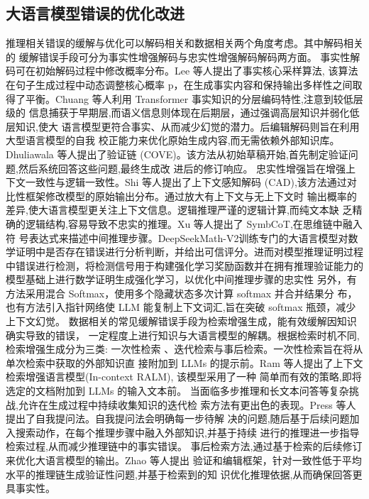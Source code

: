 \subsection{大语言模型错误的优化改进}
推理相关错误的缓解与优化可以解码相关和数据相关两个角度考虑。其中解码相关的
缓解错误手段可分为事实性增强解码与忠实性增强解码解码两方面。
事实性解码可在初始解码过程中修改概率分布。Lee 等人\cite{ref23_lee2022factuality}提出了事实核心采样算法,
该算法在句子生成过程中动态调整核心概率 p，在生成事实内容和保持输出多样性之间取
得了平衡。Chuang 等人\cite{ref18_chuang2023dola}利用 Transformer 事实知识的分层编码特性,注意到较低层级的
信息捕获于早期层,而语义信息则体现在后期层，通过强调高层知识并弱化低层知识,使大
语言模型更符合事实、从而减少幻觉的潜力。后编辑解码则旨在利用大型语言模型的自我
校正能力来优化原始生成内容,而无需依赖外部知识库。Dhuliawala 等人\cite{ref08_dhuliawala2023cove}提出了验证链
(COVE)。该方法从初始草稿开始,首先制定验证问题,然后系统回答这些问题,最终生成改
进后的修订响应。
忠实性增强旨在增强上下文一致性与逻辑一致性。Shi 等人\cite{ref20_shi2023trusting}提出了上下文感知解码
(CAD),该方法通过对比性框架修改模型的原始输出分布。通过放大有上下文与无上下文时
输出概率的差异,使大语言模型更关注上下文信息。逻辑推理严谨的逻辑计算,而纯文本缺
乏精确的逻辑结构,容易导致不忠实的推理。Xu 等人\cite{ref27_xu2024faithful}提出了 SymbCoT,在思维链中融入符
号表达式来描述中间推理步骤。DeepSeekMath-V2\cite{shao2025deepseekmath}训练专门的大语言模型对数学证明中是否存在错误进行分析判断，并给出可信评分。进而对模型推理证明过程
中错误进行检测，将检测信号用于构建强化学习奖励函数并在拥有推理验证能力的模型基础上进行数学证明生成强化学习，以优化中间推理步骤的忠实性
另外，有方法采用混合 Softmax，使用多个隐藏状态多次计算 softmax 并合并结果分
布\cite{ref28_yang2019mixtape}，也有方法引入指针网络使 LLM 能复制上下文词汇\cite{ref29_chang2023revisiting},旨在突破 softmax 瓶颈，减少
上下文幻觉。
数据相关的常见缓解错误手段为检索增强生成，能有效缓解因知识确实导致的错误，
一定程度上进行知识与大语言模型的解耦。根据检索时机不同,检索增强生成分为三类:
一次性检索 、迭代检索与事后检索。一次性检索旨在将从单次检索中获取的外部知识直
接附加到 LLMs 的提示前。Ram 等人\cite{ref30_ram2023incontext}提出了上下文检索增强语言模型(In-context RALM),
该模型采用了一种 简单而有效的策略,即将选定的文档附加到 LLMs 的输入文本前。
当面临多步推理和长文本问答等复杂挑战,允许在生成过程中持续收集知识的迭代检
索方法有更出色的表现。Press 等人\cite{ref31_press2022measuring}提出了自我提问法。自我提问法会明确每一步待解
决的问题,随后基于后续问题加入搜索动作，在每个推理步骤中融入外部知识,并基于持续
进行的推理进一步指导检索过程,从而减少推理链中的事实错误。
事后检索方法,通过基于检索的后续修订来优化大语言模型的输出。Zhao 等人\cite{ref32_zhao2023verify}提出
验证和编辑框架，针对一致性低于平均水平的推理链生成验证性问题,并基于检索到的知
识优化推理依据,从而确保回答更具事实性。




